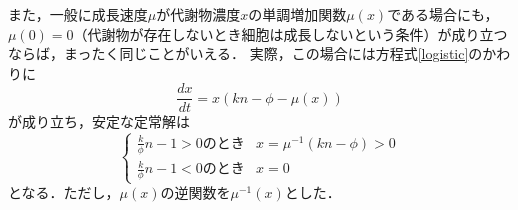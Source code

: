 また，一般に成長速度$\mu$が代謝物濃度$x$の単調増加関数$\mu(x)$である場合にも，$\mu(0)=0$（代謝物が存在しないとき細胞は成長しないという条件）が成り立つならば，まったく同じことがいえる．
実際，この場合には方程式\eqref{logistic}のかわりに
\begin{equation}
  \frac{dx}{dt} =  x \left(kn - \phi - \mu(x)\right) 
\end{equation}
が成り立ち，安定な定常解は
\begin{equation}
  \begin{cases}
    \frac{k}{\phi} n - 1 > 0 \text{のとき} & x = \mu^{-1}\left(kn - \phi \right) >0 \\
    \frac{k}{\phi} n - 1 < 0 \text{のとき} & x = 0
  \end{cases}
\end{equation}
となる．ただし，$\mu(x)$の逆関数を$\mu^{-1}(x)$とした．
